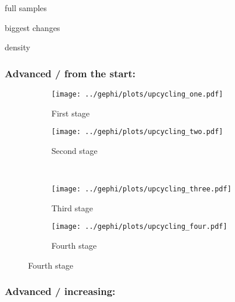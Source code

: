 \documentclass[a4paper, abstract=on]{scrartcl}
\begin{document}
    full samples

      biggest changes

      density

    \subsubsection{Advanced / from the start: }

      \begin{figure}[H]
        \caption{Social network of diffusion for  over time.}
        \centering
        \begin{subfigure}{.45\linewidth}
          \caption{First stage}
          \centering
          \texttt{[image: ../gephi/plots/upcycling\_one.pdf]}
        \end{subfigure}
        \begin{subfigure}{.45\linewidth}
          \caption{Second stage}
          \centering
          \texttt{[image: ../gephi/plots/upcycling\_two.pdf]}
        \end{subfigure}\\
        \begin{subfigure}{.45\linewidth}
          \caption{Third stage}
          \centering
          \texttt{[image: ../gephi/plots/upcycling\_three.pdf]}
        \end{subfigure}
        \begin{subfigure}{.45\linewidth}
          \caption{Fourth stage}
          \centering
          \texttt{[image: ../gephi/plots/upcycling\_four.pdf]}
        \end{subfigure}
      \end{figure}

    \subsubsection{Advanced / increasing: }
\end{document}
